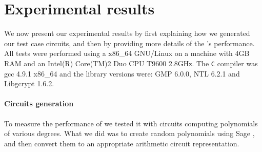 %
%

\section{Experimental results}
We now present our experimental results by first explaining how we generated
our test case circuits, and then by providing more details of the
's performance.
All tests were performed using a x86\_64 GNU/Linux on a machine with 4GB RAM
and an Intel(R) Core(TM)2 Duo CPU T9600 2.8GHz. The \texttt{C} compiler was gcc
4.9.1 x86\_64 and the library versions were: GMP 6.0.0, NTL 6.2.1 and Libgcrypt
1.6.2.

\paragraph*{Circuits generation}
To measure the performance of  we tested it
with circuits computing polynomials of various degrees.
What we did was to create random polynomials using Sage \cite{sage}, and then
convert them to an appropriate arithmetic circuit representation.

%

